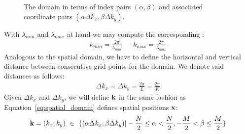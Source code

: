\begin{figure}
\centering
\caption{The \wavevector domain in terms of index pairs $(\alpha,\beta)$ and
associated coordinate pairs $(\alpha\Delta k_x,\beta\Delta k_y)$.}
\label{fig:wave_vector_domain}
\end{figure}
%
With $\lambda_{min}$ and $\lambda_{max}$ at hand we may compute the
corresponding \wavenumbers:
\begin{align}
\label{eq:kmin_kmax}
 k_{min} = \frac{2\pi}{\lambda_{min}} && k_{max} = \frac{2\pi}{\lambda_{max}}
\end{align}
%
Analogous to the spatial domain, we have to define the horizontal and vertical 
distance between consecutive grid points for the \wavevector domain. We denote 
said distances as follows:
\begin{align}
\label{eq:delta_kx_delta_ky}
 \Delta k_x = \Delta k_y = \frac{2\pi}{L} = \frac{2\pi}{K}
\end{align}
%
Given $\Delta k_x$ and $\Delta k_y$, we will define \wavevectors $\mathbf{k}$ in 
the same fashion as Equation~\ref{eq:spatial_domain} defines spatial positions 
$\mathbf{x}$:
\begin{equation}
\label{eq:wave_vector_domain}
 \mathbf{k} = (k_x,k_y)~\in~\{(\alpha\Delta k_x,\beta\Delta k_y)|
-\frac{N}{2}\leq\alpha<\frac{N}{2},-\frac{M}{2}<\beta\leq\frac{M}{2}\}
\end{equation}
